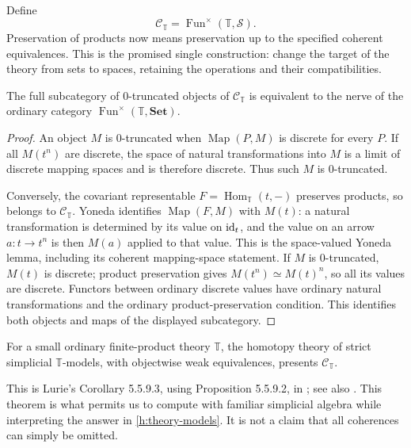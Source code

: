 Define
\begin{equation}\label{h:theory-models}
 \mathcal C_{\mathbb T}
   =\operatorname{Fun}^{\times}(\mathbb T,\mathcal S).
\end{equation}
Preservation of products now means preservation up to the specified coherent
equivalences.  This is the promised single construction: change the target
of the theory from sets to spaces, retaining the operations and their
compatibilities.

\begin{proposition}\label{h:discrete}
The full subcategory of $0$-truncated objects of $\mathcal C_{\mathbb T}$
is equivalent to the nerve of the ordinary category
$\operatorname{Fun}^{\times}(\mathbb T,\mathbf{Set})$.
\end{proposition}
\begin{proof}
An object $M$ is $0$-truncated when $\operatorname{Map}(P,M)$ is discrete
for every $P$.  If all $M(t^n)$ are discrete, the space of natural
transformations into $M$ is a limit of discrete mapping spaces and is
therefore discrete.  Thus such $M$ is $0$-truncated.

Conversely, the covariant representable
$F=\operatorname{Hom}_{\mathbb T}(t,-)$ preserves products, so belongs to
$\mathcal C_{\mathbb T}$.  Yoneda identifies
$\operatorname{Map}(F,M)$ with $M(t)$: a natural transformation is
determined by its value on $\mathrm{id}_t$, and the value on an arrow
$a:t\to t^n$ is then $M(a)$ applied to that value. This is the
space-valued Yoneda lemma, including its coherent mapping-space statement.
If $M$ is $0$-truncated, $M(t)$
is discrete; product preservation gives $M(t^n)\simeq M(t)^n$, so all its
values are discrete.  Functors between ordinary discrete values have
ordinary natural transformations and the ordinary product-preservation
condition.  This identifies both objects and maps of the displayed
subcategory.
\end{proof}

\begin{theorem}
\label{h:rigidification}
For a small ordinary finite-product theory $\mathbb T$, the homotopy theory
of strict simplicial $\mathbb T$-models, with objectwise weak equivalences,
presents $\mathcal C_{\mathbb T}$.
\end{theorem}
This is Lurie's Corollary 5.5.9.3, using Proposition 5.5.9.2, in
\cite{HTT}; see also \cite{Badzioch}.  This theorem is what permits us
to compute with familiar simplicial algebra while interpreting the answer
in \eqref{h:theory-models}.  It is not a claim that all coherences can
simply be omitted.

